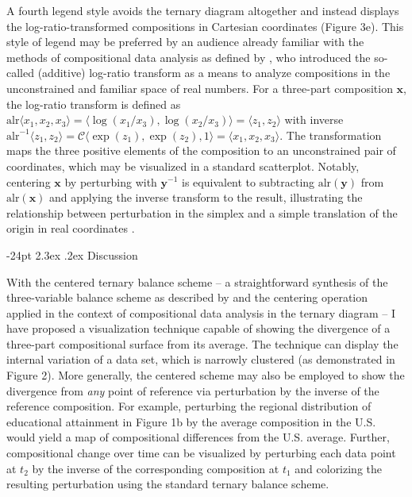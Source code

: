\documentclass[10pt,twoside,reqno]{article}
\makeatletter
\renewcommand\section{\@startsection {section}{1}{\z@}%
                                   {-24pt}%
                                   {2.3ex \@plus.2ex}%
                                   {\normalfont\large\bfseries}}
\makeatother
\begin{document}
A fourth legend style avoids the ternary diagram altogether and instead
displays the log-ratio-transformed compositions in Cartesian coordinates
(Figure 3e). This style of legend may be preferred by an audience
already familiar with the methods of compositional data analysis as
defined by \citet{Aitchison1982}, who introduced the so-called
(additive) log-ratio transform as a means to analyze compositions in the
unconstrained and familiar space of real numbers. For a three-part
composition \(\mathbf{x}\), the log-ratio transform is defined as
\(\text{alr} \langle x_1, x_2, x_3 \rangle = \langle \log (x_1/x_3), \log (x_2/x_3) \rangle = \langle z_1,z_2 \rangle\)
with inverse
\(\text{alr}^{-1}\langle z_1,z_2 \rangle=\mathcal{C}\langle \exp(z_1), \exp (z_2), 1 \rangle = \langle x_1, x_2, x_3 \rangle\).
The transformation maps the three positive elements of the composition
to an unconstrained pair of coordinates, which may be visualized in a
standard scatterplot. Notably, centering \(\mathbf{x}\) by perturbing
with \(\mathbf{y}^{-1}\) is equivalent to subtracting
\(\text{alr}(\mathbf{y})\) from \(\text{alr}(\mathbf{x})\) and applying
the inverse transform to the result, illustrating the relationship
between perturbation in the simplex and a simple translation of the
origin in real coordinates \citep{Aitchison2005a}.

\hypertarget{discussion}{%
\section{Discussion}\label{discussion}}

With the centered ternary balance scheme -- a straightforward synthesis
of the three-variable balance scheme as described by \citet{Brewer1994}
and the centering operation applied in the context of compositional data
analysis in the ternary diagram \citep{VonEynatten2002} -- I have
proposed a visualization technique capable of showing the divergence of
a three-part compositional surface from its average. The technique can
display the internal variation of a data set, which is narrowly
clustered (as demonstrated in Figure 2). More generally, the centered
scheme may also be employed to show the divergence from \emph{any} point
of reference via perturbation by the inverse of the reference
composition. For example, perturbing the regional distribution of
educational attainment in Figure 1b by the average composition in the
U.S. would yield a map of compositional differences from the U.S.
average. Further, compositional change over time can be visualized by
perturbing each data point at \(t_2\) by the inverse of the
corresponding composition at \(t_1\) \citep{Aitchison2005a} and
colorizing the resulting perturbation using the standard ternary balance
scheme.
\end{document}
